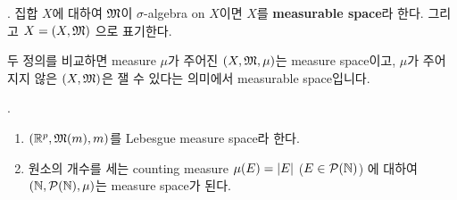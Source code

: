 .  집합 \(X\)에 대하여 \(\mathfrak{M}\)이 \(\sigma\)-algebra on \(X\)이면 \(X\)를 \textbf{measurable space}라 한다. 그리고 \(X = (X, \mathfrak{M})\) 으로 표기한다.

두 정의를 비교하면 measure \(\mu\)가 주어진 \((X, \mathfrak{M}, \mu)\)는 measure space이고, \(\mu\)가 주어지지 않은 \((X, \mathfrak{M})\)은 잴 수 있다는 의미에서 measurable space입니다.

\ex.
\begin{enumerate}
    \item \((\mathbb{R}^p, \mathfrak{M}(m), m)\)를 Lebesgue measure space라 한다.
    \item 원소의 개수를 세는 counting measure \(\mu(E) = \left| E \right|\) (\(E \in \mathcal{P}(\mathbb{N})\)) 에 대하여 \((\mathbb{N}, \mathcal{P}(\mathbb{N}), \mu)\)는 measure space가 된다.
\end{enumerate}

\pagebreak
